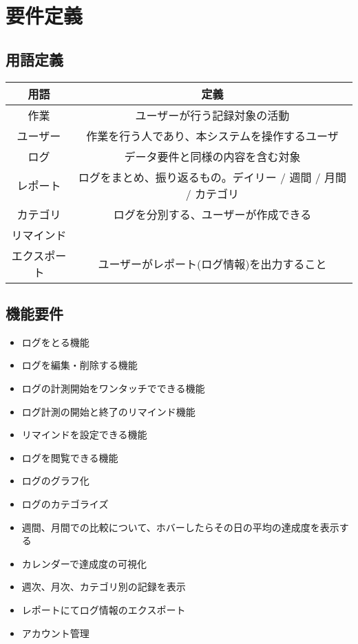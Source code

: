\section{要件定義} \label{sec:systema}

\subsection{用語定義}

\begin{table}[htbp]
  \centering
  \begin{tabular}{|c|c|}
  \hline
    用語 & 定義 \\
  \hline

  \hline
    作業 & ユーザーが行う記録対象の活動 \\
  \hline
    ユーザー & 作業を行う人であり、本システムを操作するユーザ \\
  \hline
    ログ & データ要件と同様の内容を含む対象 \\
  \hline
    レポート & ログをまとめ、振り返るもの。デイリー / 週間 / 月間 / カテゴリ \\
  \hline
    カテゴリ & ログを分別する、ユーザーが作成できる \\
  \hline
    リマインド &  \\
  \hline
    エクスポート & ユーザーがレポート(ログ情報)を出力すること \\
  \hline
  \end{tabular}
  \label{table:test1}
\end{table}

\subsection{機能要件}

\begin{itemize}
  \item ログをとる機能
  \item ログを編集・削除する機能
  \item ログの計測開始をワンタッチでできる機能
  \item ログ計測の開始と終了のリマインド機能
  \item リマインドを設定できる機能
  \item ログを閲覧できる機能
  \item ログのグラフ化
  \item ログのカテゴライズ
  \item 週間、月間での比較について、ホバーしたらその日の平均の達成度を表示する
  \item カレンダーで達成度の可視化
  \item 週次、月次、カテゴリ別の記録を表示
  \item レポートにてログ情報のエクスポート
  \item アカウント管理
\end{itemize}

